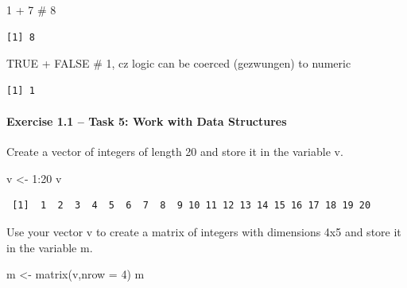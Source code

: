 \documentclass[
  letterpaper,
  DIV=11,
  numbers=noendperiod]{scrartcl}
\let\oldparagraph\paragraph
\renewcommand{\paragraph}[1]{\oldparagraph{#1}\mbox{}}
\newenvironment{Shaded}{\begin{snugshade}}{\end{snugshade}}
\newcommand{\AttributeTok}[1]{\textcolor[rgb]{0.40,0.45,0.13}{#1}}
\newcommand{\CommentTok}[1]{\textcolor[rgb]{0.37,0.37,0.37}{#1}}
\newcommand{\ConstantTok}[1]{\textcolor[rgb]{0.56,0.35,0.01}{#1}}
\newcommand{\DecValTok}[1]{\textcolor[rgb]{0.68,0.00,0.00}{#1}}
\newcommand{\FunctionTok}[1]{\textcolor[rgb]{0.28,0.35,0.67}{#1}}
\newcommand{\NormalTok}[1]{\textcolor[rgb]{0.00,0.23,0.31}{#1}}
\newcommand{\OtherTok}[1]{\textcolor[rgb]{0.00,0.23,0.31}{#1}}
\newcommand{\SpecialCharTok}[1]{\textcolor[rgb]{0.37,0.37,0.37}{#1}}
\begin{document}
\begin{Shaded}
\begin{Highlighting}[]
\DecValTok{1} \SpecialCharTok{+} \DecValTok{7} \CommentTok{\# 8}
\end{Highlighting}
\end{Shaded}

\begin{verbatim}
[1] 8
\end{verbatim}

\begin{Shaded}
\begin{Highlighting}[]
\ConstantTok{TRUE} \SpecialCharTok{+} \ConstantTok{FALSE} \CommentTok{\# 1, cz logic can be coerced (gezwungen) to numeric}
\end{Highlighting}
\end{Shaded}

\begin{verbatim}
[1] 1
\end{verbatim}

\hypertarget{exercise-1.1-task-5-work-with-data-structures}{%
\paragraph{Exercise 1.1 -- Task 5: Work with Data
Structures}\label{exercise-1.1-task-5-work-with-data-structures}}

Create a vector of integers of length 20 and store it in the variable v.

\begin{Shaded}
\begin{Highlighting}[]
\NormalTok{v }\OtherTok{\textless{}{-}} \DecValTok{1}\SpecialCharTok{:}\DecValTok{20}
\NormalTok{v}
\end{Highlighting}
\end{Shaded}

\begin{verbatim}
 [1]  1  2  3  4  5  6  7  8  9 10 11 12 13 14 15 16 17 18 19 20
\end{verbatim}

Use your vector v to create a matrix of integers with dimensions 4x5 and
store it in the variable m.

\begin{Shaded}
\begin{Highlighting}[]
\NormalTok{m }\OtherTok{\textless{}{-}} \FunctionTok{matrix}\NormalTok{(v,}\AttributeTok{nrow =} \DecValTok{4}\NormalTok{)}
\NormalTok{m}
\end{Highlighting}
\end{Shaded}
\end{document}
